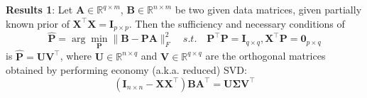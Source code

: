 \documentclass[titlepage,11pt,twoside]{article}
\begin{document}
\textbf{Results 1}: Let $\mathbf{A}\in \mathbb{R}^{q\times m}$, $\mathbf{B}\in \mathbb{R}^{n\times m}$ be two given data matrices, given partially known prior of $\mathbf{X}^{\top}\mathbf{X}=\mathbf{I}_{p\times p}$. Then the sufficiency and necessary conditions of
\begin{equation}
\mathbf{\hat{P}}=\arg\min_{\mathbf{P}}\|\mathbf{B}-\mathbf{P}\mathbf{A}\|_{F}^{2}
\quad
s.t.
\quad
\mathbf{P}^{\top}\mathbf{P} = \mathbf{I}_{q\times q}, \mathbf{X}^{\top}\mathbf{P} = \mathbf{0}_{p\times q} 
\end{equation}
is $\mathbf{\hat{P}} = \mathbf{U}\mathbf{V}^{\top}$, where $\mathbf{U}\in \mathbb{R}^{n\times q}$ and $\mathbf{V}\in \mathbb{R}^{q\times q}$ are the orthogonal matrices obtained by performing economy (a.k.a. reduced) SVD:
\begin{equation}
(\mathbf{I}_{n\times n}-\mathbf{X}\mathbf{X}^{\top})\mathbf{B}\mathbf{A}^{\top} = \mathbf{U}\mathbf{\mathbf{\Sigma}}\mathbf{V}^{\top}
\end{equation}
\end{document}
